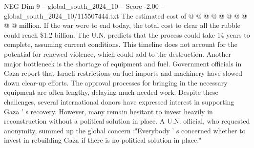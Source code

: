 \begin{textsample}{NEG Dim 9 – global\_south\_2024\_10 – Score -2.00 – global\_south\_2024\_10/115507444.txt}
The estimated cost of @ @ @ @ @ @ @ @ @ @ million.
If the war were to end today, the total cost to clear all the rubble could reach \$1.2 billion.
The U.N. predicts that the process could take 14 years to complete, assuming current conditions.
This timeline does not account for the potential for renewed violence, which could add to the destruction.
Another major bottleneck is the shortage of equipment and fuel.
Government officials in Gaza report that Israeli restrictions on fuel imports and machinery have slowed down clear-up efforts.
The approval processes for bringing in the necessary equipment are often lengthy, delaying much-needed work.
Despite these challenges, several international donors have expressed interest in supporting Gaza ' s recovery.
However, many remain hesitant to invest heavily in reconstruction without a political solution in place.
A U.N. official, who requested anonymity, summed up the global concern :"Everybody ' s concerned whether to invest in rebuilding Gaza if there is no political solution in place."

\end{textsample}
